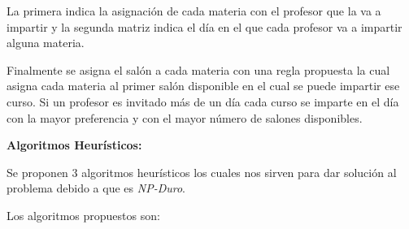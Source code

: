 \documentclass[12pt,spanish]{report}
\begin{document}
La primera indica la asignación de cada materia con el profesor que la va a impartir y la segunda matriz indica el día en el que cada profesor va a impartir alguna materia.


Finalmente se asigna el salón a cada materia con una regla propuesta la cual asigna cada materia al primer salón disponible en el cual se puede impartir ese curso. Si un profesor es invitado más de un día cada curso se imparte en el día con la mayor preferencia y con el mayor número de salones disponibles.


\begin{flushleft}
\textbf{Algoritmos Heurísticos:}
\end{flushleft}


Se proponen 3 algoritmos heurísticos los cuales nos sirven para dar solución al problema debido a que es \textit{NP-Duro}.

Los algoritmos propuestos son:
  
\end{document}
